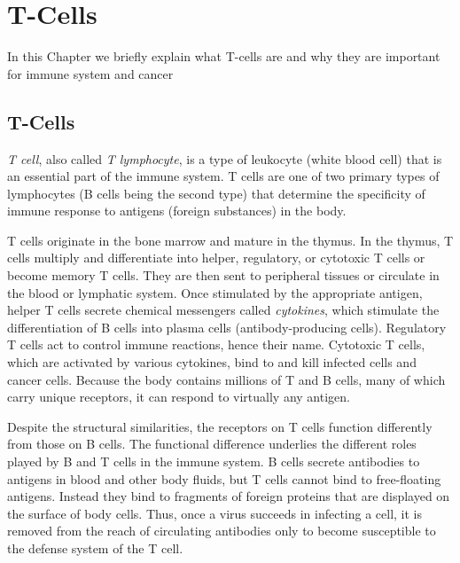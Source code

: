 \chapter{T-Cells}\label{tcells}
\lhead[\fancyplain{}{\bfseries\thepage}]{\fancyplain{}{\bfseries\rightmark}}

In this Chapter we briefly explain what T-cells are and why they are important for immune system and cancer

\section{T-Cells}

\emph{T cell}, also called \emph{T lymphocyte}, is a type of leukocyte (white blood cell) that is an essential part of the immune system. T cells are one of two primary types of lymphocytes (B cells being the second type) that determine the specificity of immune response to antigens (foreign substances) in the body.

T cells originate in the bone marrow and mature in the thymus. In the thymus, T cells multiply and differentiate into helper, regulatory, or cytotoxic T cells or become memory T cells. They are then sent to peripheral tissues or circulate in the blood or lymphatic system. Once stimulated by the appropriate antigen, helper T cells secrete chemical messengers called \emph{cytokines}, which stimulate the differentiation of B cells into plasma cells (antibody-producing cells). Regulatory T cells act to control immune reactions, hence their name. Cytotoxic T cells, which are activated by various cytokines, bind to and kill infected cells and cancer cells.
Because the body contains millions of T and B cells, many of which carry unique receptors, it can respond to virtually any antigen.

Despite the structural similarities, the receptors on T cells function differently from those on B cells. The functional difference underlies the different roles played by B and T cells in the immune system. B cells secrete antibodies to antigens in blood and other body fluids, but T cells cannot bind to free-floating antigens. Instead they bind to fragments of foreign proteins that are displayed on the surface of body cells. Thus, once a virus succeeds in infecting a cell, it is removed from the reach of circulating antibodies only to become susceptible to the defense system of the T cell.

